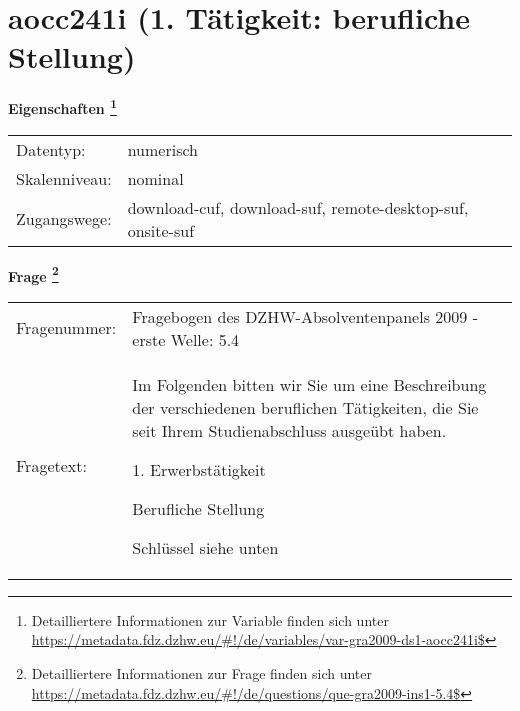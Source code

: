
    \setcounter{footnote}{0}

    \vspace*{-1.8cm}
	\section{aocc241i (1. Tätigkeit: berufliche Stellung)}
	\label{section:aocc241i}



    \vspace*{0.5cm}
    \noindent\textbf{Eigenschaften
	\footnote{Detailliertere Informationen zur Variable finden sich unter
		\url{https://metadata.fdz.dzhw.eu/\#!/de/variables/var-gra2009-ds1-aocc241i$}}}\\
	\begin{tabularx}{\hsize}{@{}lX}
	Datentyp: & numerisch \\
	Skalenniveau: & nominal \\
	Zugangswege: &
	  download-cuf, 
	  download-suf, 
	  remote-desktop-suf, 
	  onsite-suf
 \\
    \end{tabularx}



				\vspace*{0.5cm}
                \noindent\textbf{Frage
	                \footnote{Detailliertere Informationen zur Frage finden sich unter
		              \url{https://metadata.fdz.dzhw.eu/\#!/de/questions/que-gra2009-ins1-5.4$}}}\\
				\begin{tabularx}{\hsize}{@{}lX}
					Fragenummer: &
					  Fragebogen des DZHW-Absolventenpanels 2009 - erste Welle:
					  5.4
 \\
					Fragetext: & Im Folgenden bitten wir Sie um eine Beschreibung der verschiedenen beruflichen Tätigkeiten, die Sie seit Ihrem Studienabschluss ausgeübt haben.\par  1. Erwerbstätigkeit\par  Berufliche Stellung\par  Schlüssel siehe unten \\
				\end{tabularx}





